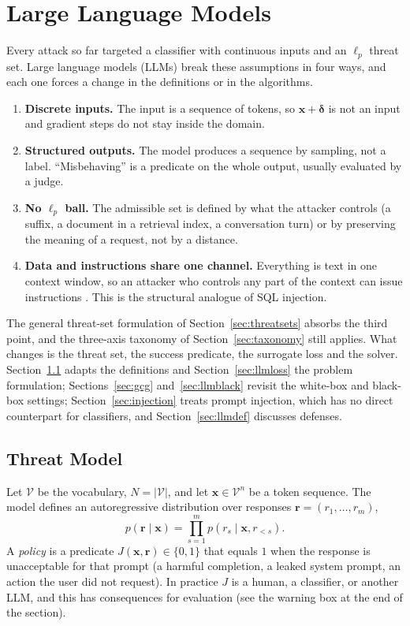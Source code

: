 \documentclass[10pt,a4paper]{extarticle}
\theoremstyle{definition}
\newcommand{\x}{\mathbf{x}}
\newcommand{\bdelta}{\boldsymbol{\delta}}
\begin{document}
\section{Large Language Models}\label{sec:llm}

Every attack so far targeted a classifier with continuous inputs and an \(\ell_p\) threat set. Large language models (LLMs) break these assumptions in four ways, and each one forces a change in the definitions or in the algorithms.
\begin{enumerate}
  \item \textbf{Discrete inputs.} The input is a sequence of tokens, so \(\x+\bdelta\) is not an input and gradient steps do not stay inside the domain.
  \item \textbf{Structured outputs.} The model produces a sequence by sampling, not a label. \enquote{Misbehaving} is a predicate on the whole output, usually evaluated by a judge.
  \item \textbf{No \(\ell_p\) ball.} The admissible set is defined by what the attacker controls (a suffix, a document in a retrieval index, a conversation turn) or by preserving the meaning of a request, not by a distance.
  \item \textbf{Data and instructions share one channel.} Everything is text in one context window, so an attacker who controls any part of the context can issue instructions \citep{nist2025ai1002}. This is the structural analogue of SQL injection.
\end{enumerate}
The general threat-set formulation of Section~\ref{sec:threatsets} absorbs the third point, and the three-axis taxonomy of Section~\ref{sec:taxonomy} still applies. What changes is the threat set, the success predicate, the surrogate loss and the solver. Section~\ref{sec:llmthreat} adapts the definitions and Section~\ref{sec:llmloss} the problem formulation; Sections~\ref{sec:gcg} and~\ref{sec:llmblack} revisit the white-box and black-box settings; Section~\ref{sec:injection} treats prompt injection, which has no direct counterpart for classifiers, and Section~\ref{sec:llmdef} discusses defenses.

\subsection{Threat Model}\label{sec:llmthreat}

Let \(\mathcal{V}\) be the vocabulary, \(N=|\mathcal{V}|\), and let \(\x\in\mathcal{V}^n\) be a token sequence. The model defines an autoregressive distribution over responses \(\mathbf{r}=(r_1,\dots,r_m)\),
\[
p(\mathbf{r}\mid\x)=\prod_{s=1}^{m}p(r_s\mid\x,r_{<s}).
\]
A \emph{policy} is a predicate \(J(\x,\mathbf{r})\in\{0,1\}\) that equals \(1\) when the response is unacceptable for that prompt (a harmful completion, a leaked system prompt, an action the user did not request). In practice \(J\) is a human, a classifier, or another LLM, and this has consequences for evaluation (see the warning box at the end of the section).
\end{document}
